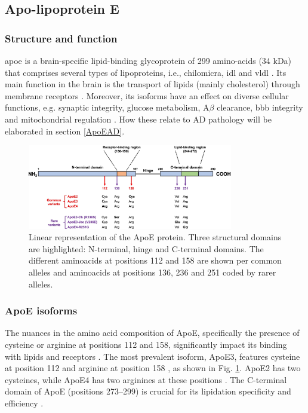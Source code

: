 \documentclass{amsart}
\theoremstyle{plain}
\begin{document}
\newpage
\subsection{Apo-lipoprotein E}\label{ApoEprot}
\subsubsection{Structure and function}
\acrshort{apoe} is a brain-specific lipid-binding glycoprotein of 299 amino-acids (34 kDa) that comprises several types of lipoproteins, i.e., chilomicra, \acrshort{idl} and \acrshort{vldl} \cite{Husain2021APOETherapeutics}. Its main function in the brain is the transport of lipids (mainly cholesterol) through membrane receptors \cite{Yang2023ApolipoproteinDisease}. Moreover, its isoforms have an effect on diverse cellular functions, e.g. synaptic integrity, glucose metabolism, A$\beta$ clearance, \acrfull{bbb} integrity and mitochondrial regulation \cite{Husain2021APOETherapeutics}. How these relate to AD pathology will be elaborated in section \ref{ApoEAD}.



\begin{figure}[]
  \includegraphics[width=0.8\textwidth]{figures/ApoEprot.png}
    \caption{Linear representation of the ApoE protein. Three structural domains are highlighted: N-terminal, hinge and C-terminal domains. The different aminoacids at positions 112 and 158 are shown per common alleles and aminoacids at positions 136, 236 and 251 coded by rarer alleles. \cite{Bu2022APOEVariants}}
  \label{fig2}
\end{figure}

\subsubsection{ApoE isoforms}
The nuances in the amino acid composition of ApoE, specifically the presence of cysteine or arginine at positions 112 and 158, significantly impact its binding with lipids and receptors \cite{Yassine2020APOEDisease}. The most prevalent isoform, ApoE3, features cysteine at position 112 and arginine at position 158  \cite{Yassine2020APOEDisease}, as shown in Fig. \ref{fig2}. ApoE2 has two cysteines, while ApoE4 has two arginines at these positions \cite{Yassine2020APOEDisease}. The C-terminal domain of ApoE (positions 273–299) is crucial for its lipidation specificity and efficiency \cite{Hu2015OpposingMice}.
\end{document}
